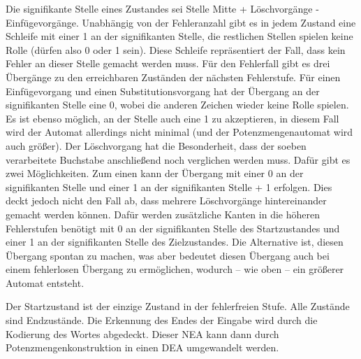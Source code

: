 Die signifikante Stelle eines Zustandes sei Stelle Mitte + Löschvorgänge - Einfügevorgänge. Unabhängig von der Fehleranzahl gibt es in jedem Zustand eine Schleife mit einer 1 an der signifikanten Stelle, die restlichen Stellen spielen keine Rolle (dürfen also 0 oder 1 sein). Diese Schleife repräsentiert der Fall, dass kein Fehler an dieser Stelle gemacht werden muss. Für den Fehlerfall gibt es drei Übergänge zu den erreichbaren Zuständen der nächsten Fehlerstufe. Für einen Einfügevorgang und einen Substitutionsvorgang hat der Übergang an der signifikanten Stelle eine 0, wobei die anderen Zeichen wieder keine Rolle spielen. Es ist ebenso möglich, an der Stelle auch eine 1 zu akzeptieren, in diesem Fall wird der Automat allerdings nicht minimal (und der Potenzmengenautomat wird auch größer). Der Löschvorgang hat die Besonderheit, dass der soeben verarbeitete Buchstabe anschließend noch verglichen werden muss. Dafür gibt es zwei Möglichkeiten. Zum einen kann der Übergang mit einer 0 an der signifikanten Stelle und einer 1 an der signifikanten Stelle + 1 erfolgen. Dies deckt jedoch nicht den Fall ab, dass mehrere Löschvorgänge hintereinander gemacht werden können. Dafür werden zusätzliche Kanten in die höheren Fehlerstufen benötigt mit 0 an der signifikanten Stelle des Startzustandes und einer 1 an der signifikanten Stelle des Zielzustandes. Die Alternative ist, diesen Übergang spontan zu machen, was aber bedeutet diesen Übergang auch bei einem fehlerlosen Übergang zu ermöglichen, wodurch -- wie oben -- ein größerer Automat entsteht.

Der Startzustand ist der einzige Zustand in der fehlerfreien Stufe. Alle Zustände sind Endzustände. Die Erkennung des Endes der Eingabe wird durch die Kodierung des Wortes abgedeckt. Dieser NEA kann dann durch Potenzmengenkonstruktion in einen DEA umgewandelt werden.

